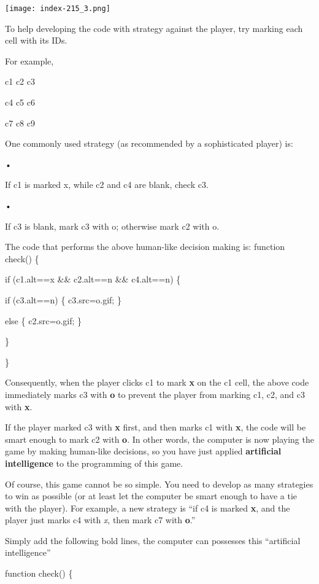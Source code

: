 \documentclass[
]{article}
\begin{document}
\texttt{[image: index-215\_3.png]}

To help developing the code with strategy against the player, try
marking each cell with its IDs.

For example,

c1 c2 c3

c4 c5 c6

c7 c8 c9

One commonly used strategy (as recommended by a sophisticated player)
is:

•

If c1 is marked x, while c2 and c4 are blank, check c3.

•

If c3 is blank, mark c3 with o; otherwise mark c2 with o.

The code that performs the above human-like decision making is: function
check() \{

if (c1.alt==\textquotesingle x\textquotesingle{} \&\&
c2.alt==\textquotesingle n\textquotesingle{} \&\&
c4.alt==\textquotesingle n\textquotesingle) \{

if (c3.alt==\textquotesingle n\textquotesingle) \{
c3.src=\textquotesingle o.gif\textquotesingle; \}

else \{ c2.src=\textquotesingle o.gif\textquotesingle; \}

\}

\}

Consequently, when the player clicks c1 to mark \textbf{x} on the c1
cell, the above code immediately marks c3 with \textbf{o} to prevent the
player from marking c1, c2, and c3 with \textbf{x}.

If the player marked c3 with \textbf{x} first, and then marks c1 with
\textbf{x}, the code will be smart enough to mark c2 with \textbf{o}. In
other words, the computer is now playing the game by making human-like
decisions, so you have just applied \textbf{artificial intelligence} to
the programming of this game.

Of course, this game cannot be so simple. You need to develop as many
strategies to win as possible (or at least let the computer be smart
enough to have a tie with the player). For example, a new strategy is
``if c4 is marked \textbf{x}, and the player just marks c4 with
\emph{x}, then mark c7 with \textbf{o}.''

Simply add the following bold lines, the computer can possesses this
``artificial intelligence''

function check() \{
\end{document}
